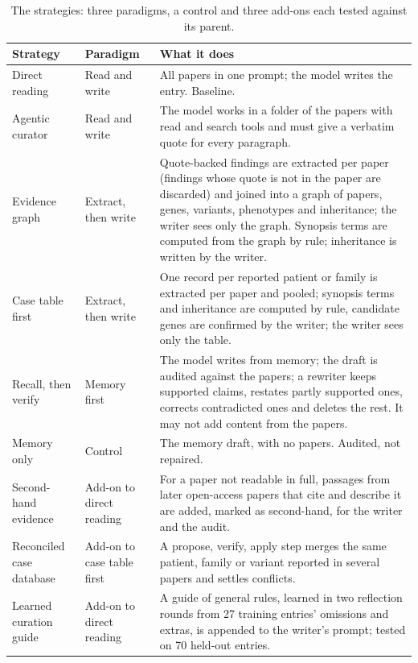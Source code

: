 \documentclass{article} %
\begin{document}
\begin{table}[!htbp]
\caption{The strategies: three paradigms, a control and three add-ons each tested against its parent.}
\label{tab:app_strategies}
\scriptsize
\begin{tabularx}{\linewidth}{>{\raggedright\arraybackslash}p{2.4cm}>{\raggedright\arraybackslash}p{2.6cm}>{\raggedright\arraybackslash}X}
\toprule
Strategy & Paradigm & What it does \\
\midrule
Direct reading & Read and write & All papers in one prompt; the model writes the entry. Baseline. \\
Agentic curator & Read and write & The model works in a folder of the papers with read and search tools and must give a verbatim quote for every paragraph. \\
Evidence graph & Extract, then write & Quote-backed findings are extracted per paper (findings whose quote is not in the paper are discarded) and joined into a graph of papers, genes, variants, phenotypes and inheritance; the writer sees only the graph. Synopsis terms are computed from the graph by rule; inheritance is written by the writer. \\
Case table first & Extract, then write & One record per reported patient or family is extracted per paper and pooled; synopsis terms and inheritance are computed by rule, candidate genes are confirmed by the writer; the writer sees only the table. \\
Recall, then verify & Memory first & The model writes from memory; the draft is audited against the papers; a rewriter keeps supported claims, restates partly supported ones, corrects contradicted ones and deletes the rest. It may not add content from the papers. \\
Memory only & Control & The memory draft, with no papers. Audited, not repaired. \\
Second-hand evidence & Add-on to direct reading & For a paper not readable in full, passages from later open-access papers that cite and describe it are added, marked as second-hand, for the writer and the audit. \\
Reconciled case database & Add-on to case table first & A propose, verify, apply step merges the same patient, family or variant reported in several papers and settles conflicts. \\
Learned curation guide & Add-on to direct reading & A guide of general rules, learned in two reflection rounds from 27 training entries' omissions and extras, is appended to the writer's prompt; tested on 70 held-out entries. \\
\bottomrule
\end{tabularx}
\end{table}
\end{document}

